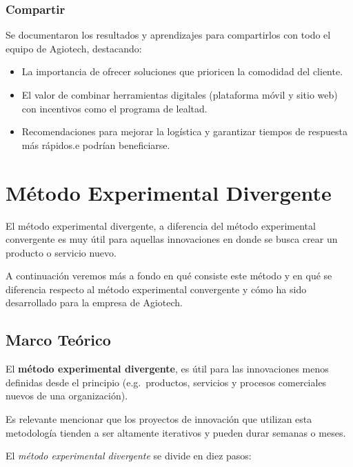 \subsubsection{Compartir}

Se documentaron los resultados y aprendizajes para compartirlos con todo el
equipo de Agiotech, destacando:

\begin{itemize}
	\item La importancia de ofrecer soluciones que prioricen la comodidad del cliente.

	\item El valor de combinar herramientas digitales (plataforma móvil y sitio
	      web) con incentivos como el programa de lealtad.

	\item Recomendaciones para mejorar la logística y garantizar tiempos de respuesta
	      más rápidos.e podrían beneficiarse.
\end{itemize}


\clearpage
\section{Método Experimental Divergente}

El método experimental divergente, a diferencia del método experimental convergente
es muy útil para aquellas innovaciones en donde se busca crear un producto o servicio
nuevo.

A continuación veremos más a fondo en qué consiste este método y en qué se diferencia
respecto al método experimental convergente y cómo ha sido desarrollado para la empresa
de Agiotech.

\subsection{Marco Teórico}

El \textbf{método experimental divergente}, es útil para las innovaciones menos
definidas desde el principio (e.g.~productos, servicios y procesos comerciales nuevos
de una organización).

Es relevante mencionar que los proyectos de innovación que utilizan esta
metodología tienden a ser altamente iterativos y pueden durar semanas o meses.

El \emph{método experimental divergente} se divide en diez pasos:

